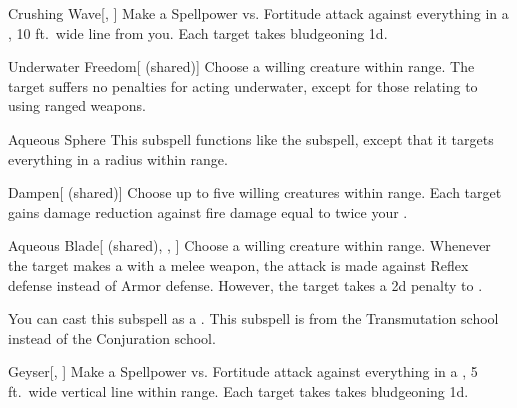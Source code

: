 \begin{ability}[\nth{1}]{Crushing Wave}[, ]
Make a Spellpower vs. Fortitude attack against everything in a \arealarge, 10 ft.\ wide line from you.
\hit Each target takes bludgeoning  \minus1d.
\end{ability}
\vspace{0.25em}


\begin{ability}[\nth{1}]{Underwater Freedom}[ (shared)]
Choose a willing creature within \rngclose range.
The target suffers no penalties for acting underwater, except for those relating to using ranged weapons.
\end{ability}
\vspace{0.25em}


\begin{ability}[\nth{2}]{Aqueous Sphere}
This subspell functions like the  subspell, except that it targets everything in a \areasmall radius within \rngclose range.
\end{ability}
\vspace{0.25em}


\begin{ability}[\nth{2}]{Dampen}[ (shared)]
Choose up to five willing creatures within \rngclose range.
Each target gains damage reduction against fire damage equal to twice your .
\end{ability}
\vspace{0.25em}


\begin{ability}[\nth{3}]{Aqueous Blade}[ (shared), , ]
Choose a willing creature within \rngclose range.
Whenever the target makes a  with a melee weapon, the attack is made against Reflex defense instead of Armor defense.
However, the target takes a \minus2d penalty to .

You can cast this subspell as a .
This subspell is from the Transmutation school instead of the Conjuration school.
\end{ability}
\vspace{0.25em}


\begin{ability}[\nth{3}]{Geyser}[, ]
Make a Spellpower vs. Fortitude attack against everything in a \arealarge, 5 ft.\ wide vertical line within \rngmed range.
\hit Each target takes takes bludgeoning  \plus1d.
\end{ability}
\vspace{0.25em}


